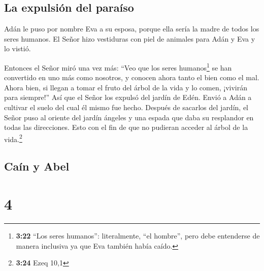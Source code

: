 \hypertarget{la-expulsiuxf3n-del-parauxedso}{%
\subsection{La expulsión del
paraíso}\label{la-expulsiuxf3n-del-parauxedso}}

 Adán le puso por nombre Eva a su esposa, porque ella
sería la madre de todos los seres humanos.  El Señor hizo
vestiduras con piel de animales para Adán y Eva y lo vistió.

 Entonces el Señor miró una vez más: ``Veo que los seres
humanos\footnote{\textbf{3:22} ``Los seres humanos'': literalmente, ``el
  hombre'', pero debe entenderse de manera inclusiva ya que Eva también
  había caído.} se han convertido en uno más como nosotros, y conocen
ahora tanto el bien como el mal. Ahora bien, si llegan a tomar el fruto
del árbol de la vida y lo comen, ¡vivirán para siempre!''
 Así que el Señor los expulsó del jardín de Edén. Envió a
Adán a cultivar el suelo del cual él mismo fue hecho. 
Después de sacarlos del jardín, el Señor puso al oriente del jardín
ángeles y una espada que daba su resplandor en todas las direcciones.
Esto con el fin de que no pudieran acceder al árbol de la
vida.\footnote{\textbf{3:24} Ezeq 10,1}

\hypertarget{cauxedn-y-abel}{%
\subsection{Caín y Abel}\label{cauxedn-y-abel}}

\hypertarget{section-3}{%
\section{4}\label{section-3}}

